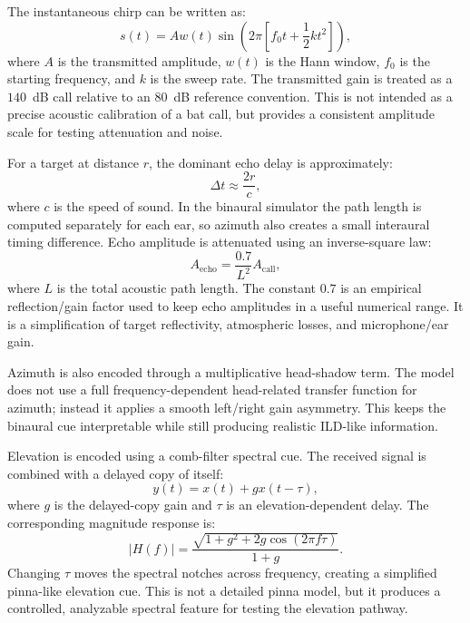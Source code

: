 The instantaneous chirp can be written as:
\begin{equation}
    s(t) = A w(t)\sin\left(2\pi\left[f_0 t + \frac{1}{2}kt^2\right]\right),
\end{equation}
where $A$ is the transmitted amplitude, $w(t)$ is the Hann window, $f_0$ is the starting frequency, and $k$ is the sweep rate. The transmitted gain is treated as a $140$~dB call relative to an $80$~dB reference convention. This is not intended as a precise acoustic calibration of a bat call, but provides a consistent amplitude scale for testing attenuation and noise.

For a target at distance $r$, the dominant echo delay is approximately:
\begin{equation}
    \Delta t \approx \frac{2r}{c},
\end{equation}
where $c$ is the speed of sound. In the binaural simulator the path length is computed separately for each ear, so azimuth also creates a small interaural timing difference. Echo amplitude is attenuated using an inverse-square law:
\begin{equation}
    A_{\text{echo}} = \frac{0.7}{L^2}A_{\text{call}},
\end{equation}
where $L$ is the total acoustic path length. The constant $0.7$ is an empirical reflection/gain factor used to keep echo amplitudes in a useful numerical range. It is a simplification of target reflectivity, atmospheric losses, and microphone/ear gain.

Azimuth is also encoded through a multiplicative head-shadow term. The model does not use a full frequency-dependent head-related transfer function for azimuth; instead it applies a smooth left/right gain asymmetry. This keeps the binaural cue interpretable while still producing realistic ILD-like information.

Elevation is encoded using a comb-filter spectral cue. The received signal is combined with a delayed copy of itself:
\begin{equation}
    y(t)=x(t)+g x(t-\tau),
\end{equation}
where $g$ is the delayed-copy gain and $\tau$ is an elevation-dependent delay. The corresponding magnitude response is:
\begin{equation}
    |H(f)| = \frac{\sqrt{1+g^2+2g\cos(2\pi f \tau)}}{1+g}.
\end{equation}
Changing $\tau$ moves the spectral notches across frequency, creating a simplified pinna-like elevation cue. This is not a detailed pinna model, but it produces a controlled, analyzable spectral feature for testing the elevation pathway.

